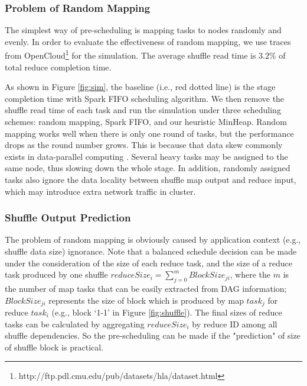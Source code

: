 \subsubsection{Problem of Random Mapping}\label{randomassign}
The simplest way of pre-scheduling is mapping tasks to nodes randomly and evenly. 
In order to evaluate the effectiveness of random mapping, we use traces from OpenCloud\footnote{\label{fn:trace}http://ftp.pdl.cmu.edu/pub/datasets/hla/dataset.html} for the simulation.
The average shuffle read time is $3.2\%$ of total reduce completion time.


As shown in Figure \ref{fig:sim}, the baseline (i.e., red dotted line) is the stage completion time with Spark FIFO scheduling algorithm. 
We then remove the shuffle read time of each task and run the simulation under three scheduling schemes: random mapping, Spark FIFO, and our heuristic MinHeap.
Random mapping works well when there is only one round of tasks, but the performance drops as the round number grows. 
This is because that data skew commonly exists in data-parallel computing \cite{skewtune, reining, gufler2012load}. 
Several heavy tasks may be assigned to the same node, thus slowing down the whole stage. 
In addition, randomly assigned tasks also ignore the data locality between shuffle map output and reduce input, which may introduce extra network traffic in cluster.

\subsubsection{Shuffle Output Prediction}\label{shuffleprediction}
The problem of random mapping is obviously caused by application context (e.g., shuffle data size) ignorance. 
Note that a balanced schedule decision can be made under the consideration of the size of each reduce task, and the size of a reduce task produced by one shuffle $reduceSize_i = \sum_{j=0}^{m} {BlockSize_{ji}}$, 
where the $m$ is the number of map tasks that can be easily extracted from DAG information; 
$BlockSize_{ji}$ represents the size of block which is produced by map $task_j$ for reduce $task_i$ (e.g., block `1-1' in Figure \ref{fig:shuffle}). 
The final sizes of reduce tasks can be calculated by aggregating $reduceSize_i$ by reduce ID among all shuffle dependencies. 
So the pre-scheduling can be made if the "prediction" of size of shuffle block is practical.

